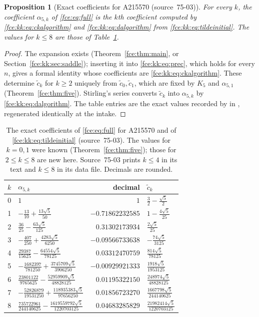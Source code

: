 \documentclass[11pt,a4paper]{article}
\numberwithin{equation}{section}
\newtheorem{proposition}[theorem]{Proposition}
\theoremstyle{definition}\newtheorem{definition}[theorem]{Definition}
\theoremstyle{remark}\newtheorem{remark}[theorem]{Remark}
\begin{document}
\begin{proposition}[Exact coefficients for A215570 (source~75-03)]\label{fce:kk:prop:alpha}
For every $k$, the coefficient $\alpha_{5,k}$ of \eqref{fce:eq:full} is the
$k$th coefficient computed by \eqref{fce:kk:eq:ckalgorithm} and
\eqref{fce:kk:eq:dalgorithm} from \eqref{fce:kk:eq:tildeinitial}. The values
for $k\le8$ are those of Table~\ref{fce:kk:tab:alpha}.
\end{proposition}
\begin{proof}
The expansion exists (Theorem~\ref{fce:thm:main}, or
Section~\ref{fce:kk:sec:saddle}); inserting it into
\eqref{fce:kk:eq:prec}, which holds for every $n$, gives a formal identity
whose coefficients are \eqref{fce:kk:eq:ckalgorithm}. These determine
$\tilde c_k$ for $k\ge2$ uniquely from $\tilde c_0,\tilde c_1$, which are
fixed by $K_5$ and $\alpha_{5,1}$ (Theorem~\ref{fce:thm:five}). Stirling's
series converts $\tilde c_k$ into $\alpha_{5,k}$ by
\eqref{fce:kk:eq:dalgorithm}. The table entries are the exact values
recorded by  in
, regenerated
identically at the intake.
\end{proof}

\begin{table}[!htbp]
\centering\small
\caption{The exact coefficients of \eqref{fce:eq:full} for A215570 and of
\eqref{fce:kk:eq:tildeinitial} (source~75-03). The values for $k=0,1$ were
known (Theorem~\ref{fce:thm:five}); those for $2\le k\le8$ are new here.
Source~75-03 prints $k\le4$ in its text and $k\le8$ in its data file.
Decimals are rounded.}\label{fce:kk:tab:alpha}
\begin{tabular}{@{}rlrl@{}}
\toprule
$k$ & $\alpha_{5,k}$ & decimal & $\tilde c_k$\\
\midrule
0&$1$&$1$&$\tfrac32-\tfrac{\sqrt5}2$\\[1pt]
1&$-\tfrac{13}{10}+\tfrac{13\sqrt5}{50}$&$-0.71862232585$&$1-\tfrac{4\sqrt5}{25}$\\[1pt]
2&$\tfrac{36}{25}-\tfrac{63\sqrt5}{125}$&$0.31302173934$&$\tfrac{2\sqrt5}{25}$\\[1pt]
3&$-\tfrac{407}{250}+\tfrac{4283\sqrt5}{6250}$&$-0.09566733638$&$-\tfrac{74\sqrt5}{3125}$\\[1pt]
4&$\tfrac{29387}{15625}-\tfrac{64554\sqrt5}{78125}$&$0.03312470759$&$\tfrac{814\sqrt5}{78125}$\\[1pt]
5&$-\tfrac{1682397}{781250}+\tfrac{3745709\sqrt5}{3906250}$&$-0.00929921333$&$\tfrac{1918\sqrt5}{1953125}$\\[1pt]
6&$\tfrac{23801122}{9765625}-\tfrac{52959909\sqrt5}{48828125}$&$0.01195322150$&$\tfrac{248974\sqrt5}{48828125}$\\[1pt]
7&$-\tfrac{52826879}{19531250}+\tfrac{118935383\sqrt5}{97656250}$&$0.01856723270$&$\tfrac{1667798\sqrt5}{244140625}$\\[1pt]
8&$\tfrac{735722961}{244140625}-\tfrac{1619559792\sqrt5}{1220703125}$&$0.04683285829$&$\tfrac{21982414\sqrt5}{1220703125}$\\
\bottomrule
\end{tabular}
\end{table}
\end{document}

